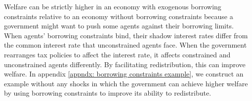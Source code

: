 \documentclass[thmsb,11pt]{article}
\begin{document}
Welfare can  be strictly higher in an economy  with exogenous
borrowing constraints  relative to an economy without borrowing constraints because  a government might want to
push some agents against their borrowing limits. When agents' borrowing
constraints bind, their shadow interest rates differ from the
common interest rate that unconstrained agents face. When the government rearranges tax
policies to  affect the  interest rate, it affects constrained and unconstrained agents
 differently.  By facilitating
redistribution, this can improve welfare. %
In appendix \ref{appndx: borrowing constraints example}, we construct an example without any
shocks in which the government can achieve higher welfare by using borrowing
constraints to improve its ability to redistribute.
\end{document}
